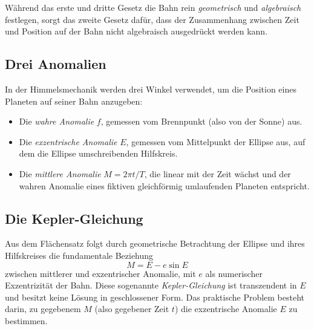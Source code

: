 Während das erste und dritte Gesetz die Bahn rein \emph{geometrisch} und \emph{algebraisch} festlegen, sorgt das zweite Gesetz dafür, dass der Zusammenhang zwischen Zeit und Position auf der Bahn nicht algebraisch ausgedrückt werden kann.

\subsection{Drei Anomalien
\label{bessel:subsection:anomalien}}

In der Himmelsmechanik werden drei Winkel verwendet, um die Position eines Planeten auf seiner Bahn anzugeben:
\begin{itemize}
\item Die \emph{wahre Anomalie} $f$, gemessen vom Brennpunkt (also von der Sonne) aus.
\item Die \emph{exzentrische Anomalie} $E$, gemessen vom Mittelpunkt der Ellipse aus, auf dem die Ellipse umschreibenden Hilfskreis.
\item Die \emph{mittlere Anomalie} $M = 2\pi t / T$, die linear mit der Zeit wächst und der wahren Anomalie eines fiktiven gleichförmig umlaufenden Planeten entspricht.
\end{itemize}

\subsection{Die Kepler-Gleichung
\label{bessel:subsection:keplergleichung}}

Aus dem Flächensatz folgt durch geometrische Betrachtung der Ellipse und ihres Hilfskreises die fundamentale Beziehung
\begin{equation}
\boxed{\;
M = E - e \sin E
\;}
\label{bessel:equation:kepler-gleichung}
\end{equation}
zwischen mittlerer und exzentrischer Anomalie, mit $e$ als numerischer Exzentrizität der Bahn.
Diese sogenannte \emph{Kepler-Gleichung} ist transzendent in $E$ und besitzt keine Lösung in geschlossener Form.
Das praktische Problem besteht darin, zu gegebenem $M$ (also gegebener Zeit $t$) die exzentrische Anomalie $E$ zu bestimmen.


